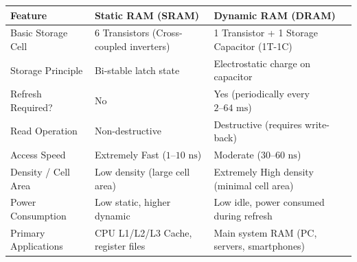 \documentclass[12pt,a4paper]{article}
\begin{document}
\par\vspace{6pt}\noindent
\begingroup
\setlength{\tabcolsep}{3.5pt}
\setlength{\extrarowheight}{3pt}
\begin{tabularx}{\linewidth}{|B{2.8cm}|Y|Y|}
\hline
\textbf{Feature} & \textbf{Static RAM (SRAM)} & \textbf{Dynamic RAM (DRAM)} \\
\hline
Basic Storage Cell & 6 Transistors (Cross-coupled inverters) & 1 Transistor + 1 Storage Capacitor (1T-1C) \\
\hline
Storage Principle & Bi-stable latch state & Electrostatic charge on capacitor \\
\hline
Refresh Required? & No & Yes (periodically every $2\text{--}64\text{ ms}$) \\
\hline
Read Operation & Non-destructive & Destructive (requires write-back) \\
\hline
Access Speed & Extremely Fast ($1\text{--}10\text{ ns}$) & Moderate ($30\text{--}60\text{ ns}$) \\
\hline
Density / Cell Area & Low density (large cell area) & Extremely High density (minimal cell area) \\
\hline
Power Consumption & Low static, higher dynamic & Low idle, power consumed during refresh \\
\hline
Primary Applications & CPU L1/L2/L3 Cache, register files & Main system RAM (PC, servers, smartphones) \\
\hline
\end{tabularx}
\endgroup
\end{document}
